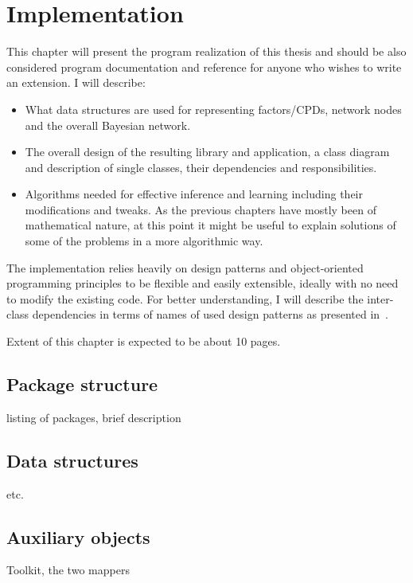 \documentclass[english,cover]{fitthesis} %
\newcommand{\srccode}[1]{{\tt #1}}         %
\newcommand{\todo}[1]{{\color{red}#1}}
\begin{document}
\chapter{Implementation}
This chapter will present the program realization of this thesis and should be also considered program documentation and reference for anyone who wishes to write an extension. I will describe:
\begin{itemize}
	\item What data structures are used for representing factors/CPDs, network nodes and the overall Bayesian network.
	\item The overall design of the resulting library and \todo{application}, \todo{a class diagram} and description of single classes, their dependencies and responsibilities.
	\item \todo{Algorithms needed for effective inference and learning including their modifications and tweaks. As the previous chapters have mostly been of mathematical nature, at this point it might be useful to explain solutions of some of the problems in a more algorithmic way.}
\end{itemize}
The implementation relies heavily on design patterns and object-oriented programming principles to be flexible and easily extensible, ideally with no need to modify the existing code. For better understanding, I will describe the inter-class dependencies in terms of names of used design patterns as presented in~\cite{head_first_design_patterns}.

\todo{Extent of this chapter is expected to be about 10 pages.}


\section{Package structure}
\todo{listing of packages, brief description}


\section{Data structures}
\todo{\srccode{Variable, Factor, Node, BayesianNetwork} etc.}








\section{Auxiliary objects}
\todo{Toolkit, the two mappers}
\end{document}
